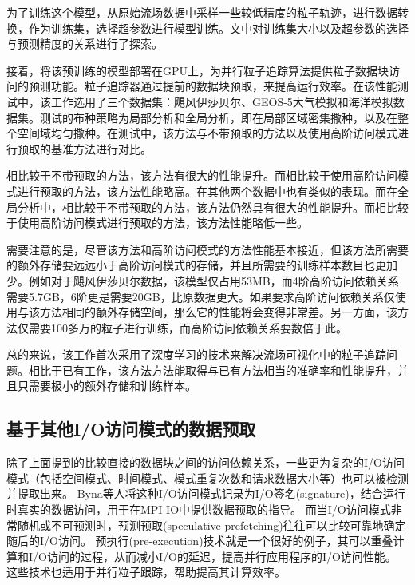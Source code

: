 为了训练这个模型，从原始流场数据中采样一些较低精度的粒子轨迹，进行数据转换，作为训练集，选择超参数进行模型训练。文中对训练集大小以及超参数的选择与预测精度的关系进行了探索。

接着，将该预训练的模型部署在GPU上，为并行粒子追踪算法提供粒子数据块访问的预测功能。粒子追踪器通过提前的数据块预取，来提高运行效率。在该性能测试中，该工作选用了三个数据集：飓风伊莎贝尔、GEOS-5大气模拟和海洋模拟数据集。测试的布种策略为局部分析和全局分析，即在局部区域密集撒种，以及在整个空间域均匀撒种。在测试中，该方法与不带预取的方法以及使用高阶访问模式\parencite{ZhangGY16}进行预取的基准方法进行对比。

相比较于不带预取的方法，该方法有很大的性能提升。而相比较于使用高阶访问模式\parencite{ZhangGY16}进行预取的方法，该方法性能略高。在其他两个数据中也有类似的表现。而在全局分析中，相比较于不带预取的方法，该方法仍然具有很大的性能提升。而相比较于使用高阶访问模式\parencite{ZhangGY16}进行预取的方法，该方法性能略低一些。

需要注意的是，尽管该方法和高阶访问模式的方法性能基本接近，但该方法所需要的额外存储要远远小于高阶访问模式的存储，并且所需要的训练样本数目也更加少。例如对于飓风伊莎贝尔数据，该模型仅占用53MB，而4阶高阶访问依赖关系需要5.7GB，6阶更是需要20GB，比原数据更大。如果要求高阶访问依赖关系仅使用与该方法相同的额外存储空间，那么它的性能将会变得非常差。另一方面，该方法仅需要100多万的粒子进行训练，而高阶访问依赖关系要数倍于此。

总的来说，该工作首次采用了深度学习的技术来解决流场可视化中的粒子追踪问题。相比于已有工作，该方法方法能取得与已有方法相当的准确率和性能提升，并且只需要极小的额外存储和训练样本。

\subsection{基于其他I/O访问模式的数据预取}
除了上面提到的比较直接的数据块之间的访问依赖关系，一些更为复杂的I/O访问模式（包括空间模式、时间模式、模式重复次数和请求数据大小等）也可以被检测并提取出来。
Byna等人\parencite{BynaCSTG08}将这种I/O访问模式记录为I/O签名(signature)，结合运行时真实的数据访问，用于在MPI-IO中提供数据预取的指导。
而当I/O访问模式非常随机或不可预测时，预测预取(speculative prefetching)往往可以比较可靠地确定随后的I/O访问。
预执行(pre-execution)技术就是一个很好的例子\parencite{ChenBSTG08}，其可以重叠计算和I/O访问的过程，从而减小I/O的延迟，提高并行应用程序的I/O访问性能。
这些技术也适用于并行粒子跟踪，帮助提高其计算效率。

